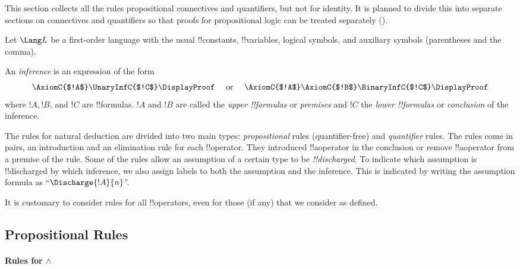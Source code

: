\documentclass[../../../include/open-logic-section]{subfiles}
\begin{document}


\begin{editorial}
  This section collects all the rules propositional connectives and
  quantifiers, but not for identity.  It is planned to divide this
  into separate sections on connectives and quantifiers so that proofs
  for propositional logic can be treated separately
  ().
\end{editorial}

Let $\Lang L$ be a first-order language with the usual !!{constant}s,
!!{variable}s, logical symbols, and auxiliary symbols (parentheses and
the comma).

\begin{defn}[Inference]
An \emph{inference} is an expression of the form
\[
\AxiomC{$!A$}
\UnaryInfC{$!C$}
\DisplayProof
\quad
\textrm{  or  }
\quad
\AxiomC{$!A$}
\AxiomC{$!B$}
\BinaryInfC{$!C$}
\DisplayProof
\]
where $!A, !B$, and $!C$ are !!{formula}s. $!A$ and $!B$ are called
the \emph{upper !!{formula}s} or \emph{premises} and $!C$ the
\emph{lower !!{formula}s} or \emph{conclusion} of the inference.
\end{defn}

The rules for natural deduction are divided into two main types:
\emph{propositional} rules (quantifier-free) and \emph{quantifier}
rules.  The rules come in pairs, an introduction and an elimination
rule for each !!{operator}. They introduced !!a{operator} in the
conclusion or remove !!a{operator} from a premise of the rule.
Some of the rules allow an assumption of a certain type to be
\emph{!!{discharged}}. To indicate which assumption is !!{discharged}
by which inference, we also assign labels to both the assumption and
the inference.  This is indicated by writing the assumption formula as
``$\Discharge{!A}{n}$''.

It is customary to consider rules for all !!{operator}s, even for
those (if any) that we consider as defined.

\subsection{Propositional Rules}

\paragraph{Rules for $\land$}
\end{document}
